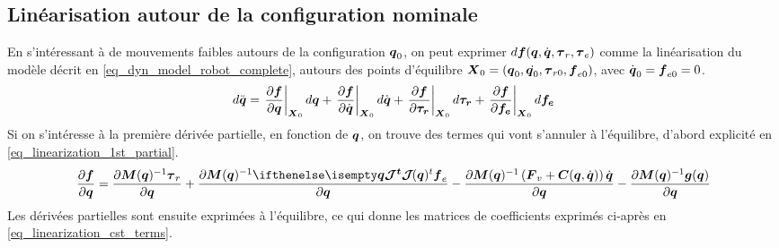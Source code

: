 \documentclass[12pt, a4paper]{article} %
\numberwithin{equation}{section}
\begin{document}
	\subsection{Linéarisation autour de la configuration nominale}
	En s'intéressant à de mouvements faibles autours de la configuration  $ \vect{q}_0 $, on peut exprimer $ d\vect{f}( \vect{q}, \dot{\vect{q}}, \vect{\tau}_r, \vect{\tau}_e) $ comme la linéarisation du modèle décrit en \cref{eq_dyn_model_robot_complete}, autours des points d'équilibre $ \matr{X}_0 = \left( \vect{q}_0, \dot{\vect{q}_0}, \vect{\tau}_{r0}, \vect{f}_{e0} \right) $, avec $ \dot{\vect{q}}_0 = \vect{f}_{e0} = 0 $.
	\begin{equation} \label{eq_linearization_dyn}
		d\ddot{\vect{q}} = \left. \frac{\partial \vect{f}}{\partial \vect{q} } \right|_{\matr{X}_0} d\vect{q} + \left. \frac{\partial \vect{f}}{\partial \dot{\vect{q}} } \right|_{\matr{X}_0} d\dot{\vect{q}} + \left. \frac{\partial \vect{f}}{\partial \vect{\tau_r}} \right|_{\matr{X}_0} d\vect{\tau_r} + \left. \frac{\partial \vect{f}}{\partial \vect{f_e}} \right|_{\matr{X}_0} d\vect{f_e}
	\end{equation}
	Si on s'intéresse à la première dérivée partielle, en fonction de $ \vect{q} $, on trouve des termes qui vont s'annuler à l'équilibre, d'abord explicité en \cref{eq_linearization_1st_partial}.
	\begin{equation} \label{eq_linearization_1st_partial}
		\frac{\partial \vect{f}}{\partial \vect{q} } = \frac{\partial \matr{M}(\vect{q})^{-1} \vect{\tau}_{r}}{\partial \vect{q} } + \frac{\partial \matr{M}(\vect{q})^{-1} \jacobian{\vect{q}}{}{t} \vect{f}_{e}}{\partial \vect{q} } - \frac{\partial \matr{M}(\vect{q})^{-1} \left( \matr{F}_v + \matr{C}(\vect{q}, \dot{\vect{q}}) \right) \dot{\vect{q}}}{\partial \vect{q} } - \frac{\partial \matr{M}(\vect{q})^{-1} \vect{g}(\vect{q})}{\partial \vect{q} } 
	\end{equation}
	Les dérivées partielles sont ensuite exprimées à l'équilibre, ce qui donne les matrices de coefficients exprimés ci-après en \cref{eq_linearization_cst_terms}.
\end{document}
